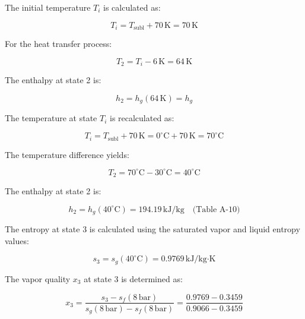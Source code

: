 The initial temperature \( T_i \) is calculated as:  

\[
T_i = T_{\text{subl}} + 70 \, \text{K} = 70 \, \text{K}
\]

For the heat transfer process:  

\[
T_2 = T_i - 6 \, \text{K} = 64 \, \text{K}
\]

The enthalpy at state 2 is:  

\[
h_2 = h_g (64 \, \text{K}) = h_g
\]

The temperature at state \( T_i \) is recalculated as:  

\[
T_i = T_{\text{subl}} + 70 \, \text{K} = 0^\circ \text{C} + 70 \, \text{K} = 70^\circ \text{C}
\]

The temperature difference yields:  

\[
T_2 = 70^\circ \text{C} - 30^\circ \text{C} = 40^\circ \text{C}
\]

The enthalpy at state 2 is:  

\[
h_2 = h_g (40^\circ \text{C}) = 194.19 \, \text{kJ/kg} \quad \text{(Table A-10)}
\]

The entropy at state 3 is calculated using the saturated vapor and liquid entropy values:  

\[
s_3 = s_g (40^\circ \text{C}) = 0.9769 \, \text{kJ/kg·K}
\]

The vapor quality \( x_3 \) at state 3 is determined as:  

\[
x_3 = \frac{s_3 - s_f (8 \, \text{bar})}{s_g (8 \, \text{bar}) - s_f (8 \, \text{bar})} = \frac{0.9769 - 0.3459}{0.9066 - 0.3459}
\]